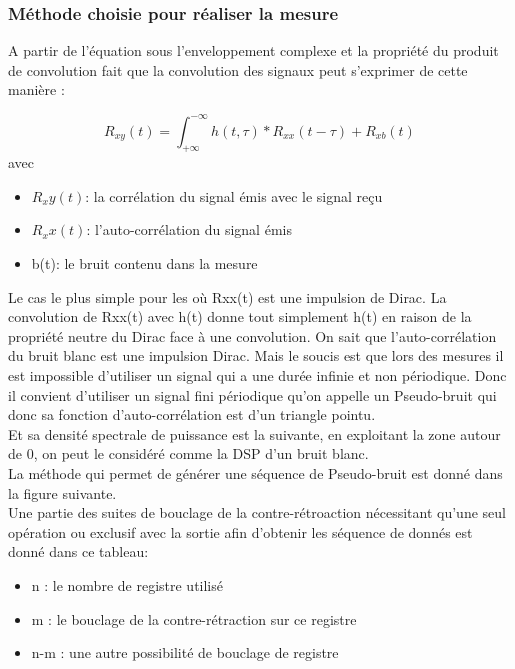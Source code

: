 \subsubsection{Méthode choisie pour réaliser la mesure}

A partir de l'équation sous l'enveloppement complexe et la propriété du produit de convolution fait que la convolution des signaux peut s'exprimer de cette manière :

\[ R_{xy}(t)= \int_{+\infty}^{-\infty} h(t,\tau)*R_{xx}(t- \tau)+R_{xb}(t) \]
 avec 
\begin{itemize}[label=, font=\large \color{lightgray}]
\item $ R_xy(t) $: la corrélation du signal émis avec le signal reçu
\item $ R_xx(t) $: l'auto-corrélation du signal émis
\item b(t): 	\quad le bruit contenu dans la mesure
\end{itemize}

Le cas le plus simple pour les  où Rxx(t) est une impulsion de Dirac. La convolution de Rxx(t) avec h(t) donne tout simplement h(t) en raison de la propriété neutre du Dirac face à une convolution. On sait que l'auto-corrélation du bruit blanc est une impulsion Dirac. Mais le soucis est que lors des mesures il est impossible d'utiliser un signal qui a une durée infinie et non périodique. Donc il convient d'utiliser un signal fini périodique qu'on appelle un Pseudo-bruit qui donc sa fonction d'auto-corrélation est d'un triangle pointu. 
\\
Et sa densité spectrale de puissance est la suivante, en exploitant la zone autour de 0, on peut le considéré comme la DSP d'un bruit blanc.
\\
La méthode qui permet de générer une séquence de Pseudo-bruit est donné dans la figure suivante.
\label{gene code pseudo}
\\
Une partie des suites de bouclage de la contre-rétroaction nécessitant qu'une seul opération ou exclusif avec la sortie afin d'obtenir les séquence de donnés est donné dans ce tableau:
\\
\begin{itemize}[label=, font=\large \color{lightgray}]
\item n : le nombre de registre utilisé
\item m : le bouclage de la contre-rétraction sur ce registre
\item n-m : une autre possibilité de bouclage de registre
\end{itemize}

